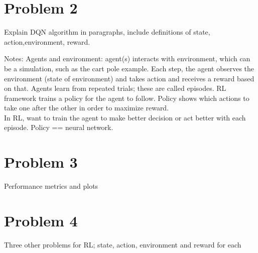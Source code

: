 \documentclass{article}
\numberwithin{equation}{section}
\numberwithin{equation}{section}
\begin{document}
\section{Problem 2}
Explain DQN algorithm in paragraphs, include definitions of state, action,environment, reward.

Notes: Agents and environment: agent(s) interacts with environment, which can be a simulation, such as the cart pole example. Each step, the agent observes the environment (state of environment) and takes action and receives a reward based on that. Agents learn from repeated trials; these are called episodes. RL framework trains a policy for the agent to follow. Policy shows which actions to take one after the other in order to maximize reward. \\

In RL, want to train the agent to make better decision or act better with each episode. Policy == neural network. 





\section{Problem 3}
Performance metrics and plots








\section{Problem 4}
Three other problems for RL; state, action, environment and reward for each


\begin{comment}
\begin{figure}
	\centering
	\hspace*{-3.0cm}
	\texttt{[image: Q4.2M.png]}
	\\	
	\textbf{Fig.7:} Comparator for 3-bit signed integers, $a=-2=[1,1,0]$
	\\
	\label{fig:Fig.7}
\end{figure}
\end{comment}
\end{document}
